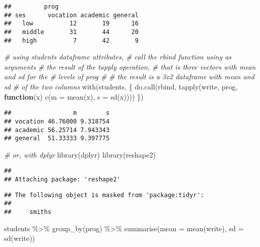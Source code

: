 \documentclass[
  oneside]{book}
\newenvironment{Shaded}{\begin{snugshade}}{\end{snugshade}}
\newcommand{\AttributeTok}[1]{\textcolor[rgb]{0.77,0.63,0.00}{#1}}
\newcommand{\CommentTok}[1]{\textcolor[rgb]{0.56,0.35,0.01}{\textit{#1}}}
\newcommand{\ControlFlowTok}[1]{\textcolor[rgb]{0.13,0.29,0.53}{\textbf{#1}}}
\newcommand{\FunctionTok}[1]{\textcolor[rgb]{0.00,0.00,0.00}{#1}}
\newcommand{\NormalTok}[1]{#1}
\newcommand{\SpecialCharTok}[1]{\textcolor[rgb]{0.00,0.00,0.00}{#1}}
\begin{document}
\begin{verbatim}
##         prog
## ses      vocation academic general
##   low          12       19      16
##   middle       31       44      20
##   high          7       42       9
\end{verbatim}

\begin{Shaded}
\begin{Highlighting}[]
\CommentTok{\# using students dataframe attributes,}
\CommentTok{\# call the rbind function using as arguments}
\CommentTok{\# the result of the tapply operation,}
\CommentTok{\# that is three vectors with mean and sd for the}
\CommentTok{\# levels of \textasciigrave{}prog\textasciigrave{}}
\CommentTok{\#}
\CommentTok{\# the result is a 3x2 dataframe with mean and sd}
\CommentTok{\# of the two columns}
\FunctionTok{with}\NormalTok{(students, \{}
       \FunctionTok{do.call}\NormalTok{(rbind, }\FunctionTok{tapply}\NormalTok{(write, prog, }
                             \ControlFlowTok{function}\NormalTok{(x) }\FunctionTok{c}\NormalTok{(}\AttributeTok{m =} \FunctionTok{mean}\NormalTok{(x), }\AttributeTok{s =} \FunctionTok{sd}\NormalTok{(x))))}
\NormalTok{\})}
\end{Highlighting}
\end{Shaded}

\begin{verbatim}
##                 m        s
## vocation 46.76000 9.318754
## academic 56.25714 7.943343
## general  51.33333 9.397775
\end{verbatim}

\begin{Shaded}
\begin{Highlighting}[]
\CommentTok{\# or, with dplyr}
\FunctionTok{library}\NormalTok{(dplyr)}
\FunctionTok{library}\NormalTok{(reshape2)}
\end{Highlighting}
\end{Shaded}

\begin{verbatim}
## 
## Attaching package: 'reshape2'
\end{verbatim}

\begin{verbatim}
## The following object is masked from 'package:tidyr':
## 
##     smiths
\end{verbatim}

\begin{Shaded}
\begin{Highlighting}[]
\NormalTok{students }\SpecialCharTok{\%\textgreater{}\%}
  \FunctionTok{group\_by}\NormalTok{(prog) }\SpecialCharTok{\%\textgreater{}\%}
  \FunctionTok{summarise}\NormalTok{(}\AttributeTok{mean =} \FunctionTok{mean}\NormalTok{(write), }\AttributeTok{sd =} \FunctionTok{sd}\NormalTok{(write))}
\end{Highlighting}
\end{Shaded}
\end{document}

